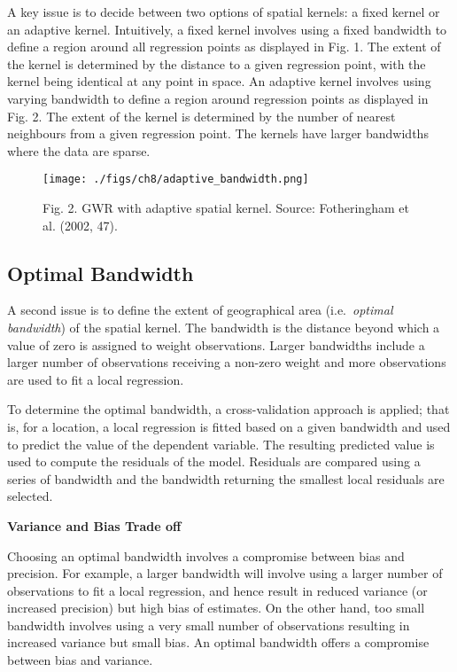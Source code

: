 \documentclass[
  letterpaper,
  krantz2]{style/krantz}
\begin{document}
A key issue is to decide between two options of spatial kernels: a fixed
kernel or an adaptive kernel. Intuitively, a fixed kernel involves using
a fixed bandwidth to define a region around all regression points as
displayed in Fig. 1. The extent of the kernel is determined by the
distance to a given regression point, with the kernel being identical at
any point in space. An adaptive kernel involves using varying bandwidth
to define a region around regression points as displayed in Fig. 2. The
extent of the kernel is determined by the number of nearest neighbours
from a given regression point. The kernels have larger bandwidths where
the data are sparse.

\begin{figure}

{\centering \texttt{[image: ./figs/ch8/adaptive\_bandwidth.png]}

}

\caption{Fig. 2. GWR with adaptive spatial kernel. Source: Fotheringham
et al. (2002, 47).}

\end{figure}

\hypertarget{optimal-bandwidth}{%
\subsection{Optimal Bandwidth}\label{optimal-bandwidth}}

A second issue is to define the extent of geographical area
(i.e.~\emph{optimal bandwidth}) of the spatial kernel. The bandwidth is
the distance beyond which a value of zero is assigned to weight
observations. Larger bandwidths include a larger number of observations
receiving a non-zero weight and more observations are used to fit a
local regression.

To determine the optimal bandwidth, a cross-validation approach is
applied; that is, for a location, a local regression is fitted based on
a given bandwidth and used to predict the value of the dependent
variable. The resulting predicted value is used to compute the residuals
of the model. Residuals are compared using a series of bandwidth and the
bandwidth returning the smallest local residuals are selected.

\textbf{Variance and Bias Trade off}

Choosing an optimal bandwidth involves a compromise between bias and
precision. For example, a larger bandwidth will involve using a larger
number of observations to fit a local regression, and hence result in
reduced variance (or increased precision) but high bias of estimates. On
the other hand, too small bandwidth involves using a very small number
of observations resulting in increased variance but small bias. An
optimal bandwidth offers a compromise between bias and variance.
\end{document}
